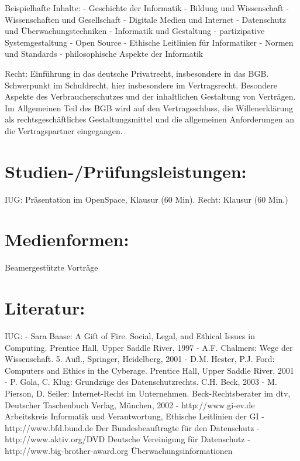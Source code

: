 Beispielhafte Inhalte: - Geschichte der Informatik - Bildung und
Wissenschaft - Wissenschaften und Gesellschaft - Digitale Medien und
Internet - Datenschutz und Überwachungstechniken - Informatik und
Gestaltung - partizipative Systemgestaltung - Open Source - Ethische
Leitlinien für Informatiker - Normen und Standards - philosophische
Aspekte der Informatik

Recht: Einführung in das deutsche Privatrecht, insbesondere in das BGB.
Schwerpunkt im Schuldrecht, hier insbesondere im Vertragsrecht.
Besondere Aspekte des Verbraucherschutzes und der inhaltlichen
Gestaltung von Verträgen. Im Allgemeinen Teil des BGB wird auf den
Vertragsschluss, die Willenerklärung als rechtsgeschäftliches
Gestaltungsmittel und die allgemeinen Anforderungen an die
Vertragspartner eingegangen.

\section{Studien-/Prüfungsleistungen:}\label{studien-pruxfcfungsleistungen-16}

IUG: Präsentation im OpenSpace, Klausur (60 Min). Recht: Klausur (60
Min.)

\section{Medienformen:}\label{medienformen-16}

Beamergestützte Vorträge

\section{Literatur:}\label{literatur-16}

IUG: - Sara Baase: A Gift of Fire. Social, Legal, and Ethical Issues in
Computing. Prentice Hall, Upper Saddle River, 1997 - A.F. Chalmers: Wege
der Wissenschaft. 5. Aufl., Springer, Heidelberg, 2001 - D.M. Hester,
P.J. Ford: Computers and Ethics in the Cyberage. Prentice Hall, Upper
Saddle River, 2001 - P. Gola, C. Klug: Grundzüge des Datenschutzrechts.
C.H. Beck, 2003 - M. Pierson, D. Seiler: Internet-Recht im Unternehmen.
Beck-Rechtsberater im dtv, Deutscher Taschenbuch Verlag, München, 2002 -
http://www.gi-ev.de Arbeitskreis Informatik und Verantwortung, Ethische
Leitlinien der GI - http://www.bfd.bund.de Der Bundesbeauftragte für den
Datenschutz - http://www.aktiv.org/DVD Deutsche Vereinigung für
Datenschutz - http://www.big-brother-award.org Überwachungsinformationen


